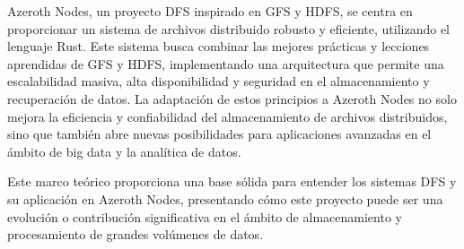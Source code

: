 Azeroth Nodes, un proyecto DFS inspirado en GFS y HDFS, se centra en proporcionar un sistema de archivos distribuido robusto y eficiente, utilizando el lenguaje Rust. Este sistema busca combinar las mejores prácticas y lecciones aprendidas de GFS y HDFS, implementando una arquitectura que permite una escalabilidad masiva, alta disponibilidad y seguridad en el almacenamiento y recuperación de datos. La adaptación de estos principios a Azeroth Nodes no solo mejora la eficiencia y confiabilidad del almacenamiento de archivos distribuidos, sino que también abre nuevas posibilidades para aplicaciones avanzadas en el ámbito de big data y la analítica de datos.\newline \hfill \break

Este marco teórico proporciona una base sólida para entender los sistemas DFS y su aplicación en Azeroth Nodes, presentando cómo este proyecto puede ser una evolución o contribución significativa en el ámbito de almacenamiento y procesamiento de grandes volúmenes de datos.